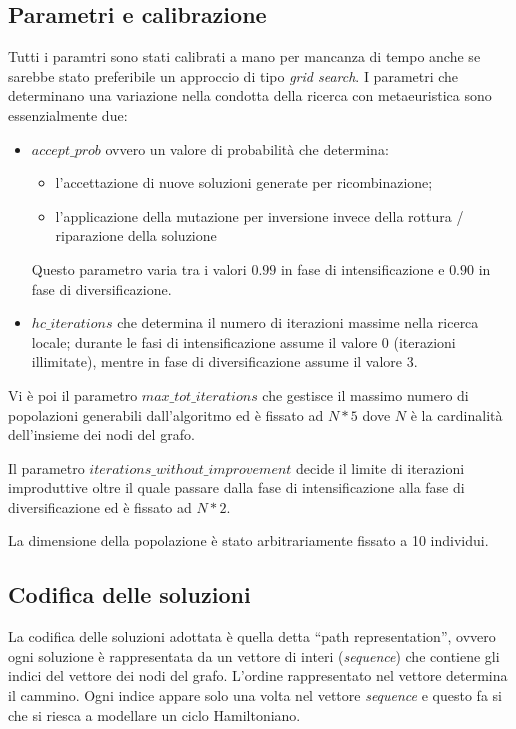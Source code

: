 \documentclass[a4paper]{article}
\begin{document}
        \subsection{Parametri e calibrazione}
            Tutti i paramtri sono stati calibrati a mano per mancanza di tempo anche se sarebbe stato preferibile un approccio di tipo
            \emph{grid search}.
            I parametri che determinano una variazione nella condotta della ricerca con metaeuristica sono essenzialmente due:
            \begin{itemize}
                \item $accept\_prob$ ovvero un valore di probabilit\`a che determina:
                    \begin{itemize}
                        \item l'accettazione di nuove soluzioni generate per ricombinazione;
                        \item l'applicazione della mutazione per inversione invece della rottura / riparazione della soluzione
                    \end{itemize}
                    Questo parametro varia tra i valori $0.99$ in fase di intensificazione e $0.90$ in fase di diversificazione.
                \item $hc\_iterations$ che determina il numero di iterazioni massime nella ricerca locale; durante le fasi di
                    intensificazione assume il valore $0$ (iterazioni illimitate), mentre in fase di diversificazione assume il valore 3.
            \end{itemize}

            Vi \`e poi il parametro $max\_tot\_iterations$ che gestisce il massimo numero di popolazioni generabili dall'algoritmo ed \`e fissato
            ad $N*5$ dove $N$ \`e la cardinalit\`a dell'insieme dei nodi del grafo.

            Il parametro $iterations\_without\_improvement$ decide il limite di iterazioni improduttive oltre il quale passare dalla
            fase di intensificazione alla fase di diversificazione ed \`e fissato ad $N*2$.

            La dimensione della popolazione \`e stato arbitrariamente fissato a 10 individui.

        \subsection{Codifica delle soluzioni}
            La codifica delle soluzioni adottata \`e quella detta ``path representation'', ovvero
            ogni soluzione \`e rappresentata da un vettore di interi (\emph{sequence}) che contiene
            gli indici del vettore dei nodi del grafo. L'ordine rappresentato nel vettore determina il cammino.
            Ogni indice appare solo una volta nel vettore \emph{sequence} e questo fa si che si riesca a modellare
            un ciclo Hamiltoniano.
\end{document}
